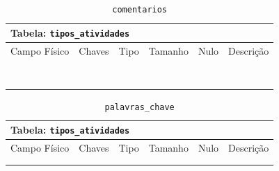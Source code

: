 \documentclass[12pt,a4paper]{article}
\begin{document}
\begin{center}
\begin{table}[h!]
	\caption{\texttt{comentarios}}
	\label{tabela:comentarios}
	\begin{tabular}{|p{2.5cm}|p{1cm}|p{1.25cm}|p{1.75cm}|p{1.25cm}|p{5cm}|}\hline	
		\multicolumn{6}{|p{16cm}|}{\cellcolor{cinzaClaro}  \centering Tabela: \texttt{tipos\_atividades}} \\ \hline %
		{\small Campo Físico}   & {\small Chaves} & {\small Tipo} & {\small Tamanho} & {\small Nulo} & {\small Descrição}\\\hline %
		
		{\tiny } & {\tiny } & {\tiny } & {\tiny } & {\tiny } &{\tiny }\\\hline
		{\tiny } & {\tiny } & {\tiny } & {\tiny } & {\tiny } &{\tiny }\\\hline
		{\tiny } & {\tiny } & {\tiny } & {\tiny } & {\tiny } &{\tiny }\\\hline
		{\tiny } & {\tiny } & {\tiny } & {\tiny } & {\tiny } &{\tiny }\\\hline
		{\tiny } & {\tiny } & {\tiny } & {\tiny } & {\tiny } &{\tiny }\\\hline
		{\tiny } & {\tiny } & {\tiny } & {\tiny } & {\tiny } &{\tiny }\\\hline
		{\tiny } & {\tiny } & {\tiny } & {\tiny } & {\tiny } &{\tiny }\\\hline
		{\tiny } & {\tiny } & {\tiny } & {\tiny } & {\tiny } &{\tiny }\\\hline
		
			
	\end{tabular}
\end{table}	
\end{center}

\begin{center}
\begin{table}[h!]
	\caption{\texttt{palavras\_chave}}
	\label{tabela:palavrasChave}
	\begin{tabular}{|p{2.5cm}|p{1cm}|p{1.25cm}|p{1.75cm}|p{1.25cm}|p{5cm}|}\hline	
		\multicolumn{6}{|p{16cm}|}{\cellcolor{cinzaClaro}  \centering Tabela: \texttt{tipos\_atividades}} \\ \hline %
		{\small Campo Físico}   & {\small Chaves} & {\small Tipo} & {\small Tamanho} & {\small Nulo} & {\small Descrição}\\\hline %
		
		{\tiny } & {\tiny } & {\tiny } & {\tiny } & {\tiny } &{\tiny }\\\hline
		{\tiny } & {\tiny } & {\tiny } & {\tiny } & {\tiny } &{\tiny }\\\hline
			
	\end{tabular}
\end{table}	
\end{center}
\end{document}
